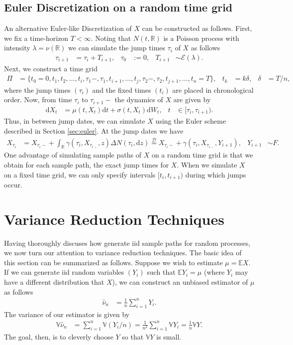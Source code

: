\documentclass[12pt]{book}
\numberwithin{equation}{chapter}
\theoremstyle{plain}
\numberwithin{theorem}{section}
\theoremstyle{definition}
\numberwithin{exercise}{chapter}
\newcommand{\<}{\langle}
\renewcommand{\>}{\rangle}
\renewcommand{\(}{\left(}
\renewcommand{\)}{\right)}
\renewcommand{\[}{\left[}
\renewcommand{\]}{\right]}
\newcommand\Eb{\mathds{E}}
\newcommand\Rb{\mathds{R}}
\newcommand\Vb{\mathds{V}}
\newcommand\Dc{\mathscr{D}}
\newcommand\Ec{\mathscr{E}}
\newcommand\sig{\sigma}
\newcommand\gam{\gamma}
\newcommand\lam{\lambda}
\newcommand\del{\delta}
\newcommand\Del{\Delta}
\newcommand\nuh{\widehat{\nu}}
\newcommand\dd{\mathrm{d}}
\begin{document}
\subsection{Euler Discretization on a random time grid}
An alternative Euler-like Discretization of $X$ can be constructed as follows.  First, we fix a time-horizon $T < \infty$.  Noting that $N(t,\Rb)$ is a Poisson process with intensity $\lam = \nu(\Rb)$ we can simulate the jump times $\tau_i$ of $X$ as follows
\begin{align}
\tau_{i+1}
	&=	\tau_i + T_{i+1} , &
\tau_0
	&:=	0 , &
T_{i+1}
	&\sim \Ec(\lam) .
\end{align}
Next, we construct a time grid
\begin{align}
\Pi
	&=	\{ t_0 = 0, t_1, t_2, \ldots, t_i, \tau_1-,\tau_1, t_{i+1}, \ldots, t_{j}, \tau_2-,\tau_2, t_{j+1}, \ldots, t_n = T \} , &
t_k
	&=	k \del , &
\del
	&=	T / n ,
\end{align}
where the jump times $(\tau_i)$ and the fixed times $(t_i)$ are placed in chronological order.
Now, from time $\tau_i$ to $\tau_{i+1}-$ the dynamics of $X$ are given by
\begin{align}
\dd X_t
	&=	\mu(t,X_t) \dd t + \sig(t,X_t) \dd W_t , &
t
	&\in [\tau_i,\tau_{i+1}) .
\end{align}
Thus, in between jump dates, we can simulate $X$ using the Euler scheme described in Section \ref{sec:euler}.  At the jump dates we have
\begin{align}
X_{\tau_i}
	&=	X_{\tau_i-} + \int_\Rb \gam(\tau_i,X_{\tau_{i-}},z) \Del N(\tau_i,\dd z) 
	\stackrel{\Dc}{=} X_{\tau_i-} + \gam(\tau_i,X_{\tau_{i-}},Y_{i+1}) , &
Y_{i+1}
	&\sim F .
\end{align}
One advantage of simulating sample paths of $X$ on a random time grid is that we obtain for each sample path, the exact jump times for $X$.  When we simulate $X$ on a fixed time grid, we can only specify intervals $[t_i, t_{i+1})$ during which jumps occur.

\section{Variance Reduction Techniques}
\label{sec:VarReduction}
Having thoroughly discuses how generate iid sample paths for random processes, we now turn our attention to variance reduction techniques.  The basic idea of this section can be summarized as follows.  Suppose we wish to estimate $\mu = \Eb X$.  If we can generate iid random variables $(Y_i)$ such that $\Eb Y_i = \mu$ (where $Y_i$ may have a different distribution that $X$), we can construct an unbiased estimator of $\mu$ as follows
\begin{align}
\nuh_n
	&=	\frac{1}{n} \sum_{i=1}^n Y_i .
\end{align}
The variance of our estimator is given by
\begin{align}
\Vb \nuh_n
	&=	\sum_{i=1}^n \Vb (Y_i/n)
	=		\frac{1}{n^2} \sum_{i=1}^n \Vb Y_i 
	=		\frac{1}{n} \Vb Y .
\end{align}
The goal, then, is to cleverly choose $Y$ so that $\Vb Y$ is small.
\end{document}
